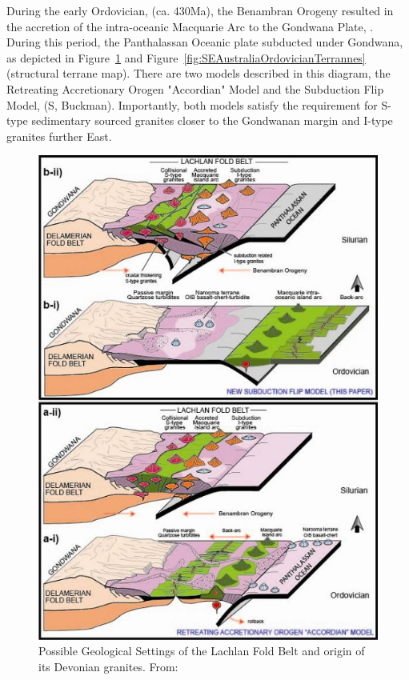 \documentclass[a4paper]{article}
\begin{document}
During the early Ordovician, (ca. 430Ma), the Benambran Orogeny resulted in the accretion of the intra-oceanic Macquarie Arc to the Gondwana Plate, \cite{BenambranOrogeny}.  During this period, the Panthalassan Oceanic plate subducted under Gondwana, as depicted in Figure~\ref{fig:GraniteModels} and Figure~\ref{fig:SEAustraliaOrdovicianTerrannes} (structural  terrane map). There are two models described in this diagram, the Retreating Accretionary Orogen "Accordian" Model and the Subduction Flip Model, (S, Buckman). Importantly, both models satisfy the requirement for S-type sedimentary sourced granites closer to the Gondwanan margin and I-type granites further East.

\begin{figure}[H]
\centering
\includegraphics[width=1\textwidth]{granite_models.jpg}
\caption{\label{fig:GraniteModels} Possible Geological Settings of the Lachlan Fold Belt and origin of its Devonian granites. From: \cite{aitchison2012accordion}}
\end{figure}
\end{document}
